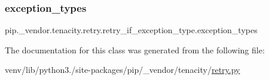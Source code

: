 \subsubsection{\texorpdfstring{exception\+\_\+types}{exception\_types}}
{\footnotesize\ttfamily pip.\+\_\+vendor.\+tenacity.\+retry.\+retry\+\_\+if\+\_\+exception\+\_\+type.\+exception\+\_\+types\hspace{0.3cm}{\ttfamily [static]}}



The documentation for this class was generated from the following file\+:\begin{DoxyCompactItemize}
\item 
venv/lib/python3./site-\/packages/pip/\+\_\+vendor/tenacity/\hyperlink{tenacity_2retry_8py}{retry.\+py}\end{DoxyCompactItemize}
